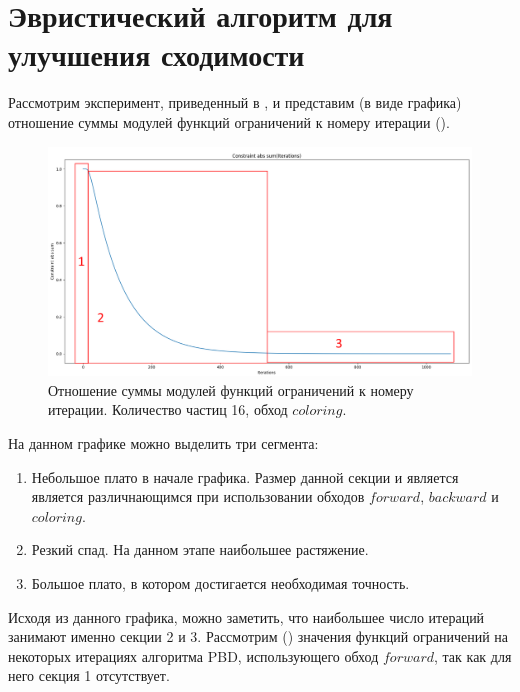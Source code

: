 \section{Эвристический алгоритм для улучшения сходимости} \label{ch3:heuristic}
	Рассмотрим эксперимент, приведенный в , и представим (в виде графика) отношение суммы модулей функций ограничений к номеру итерации (). 

\begin{figure}[ht!] 
	\center
	\includegraphics [scale=0.4] {my_folder/images//plot_16_coloring.png}
	\caption{Отношение суммы модулей функций ограничений к номеру итерации. Количество частиц 16, обход $coloring$.}
	\label{fig:csum-over-iterations}  
\end{figure}	

	На данном графике можно выделить три сегмента:
	\begin{enumerate}[1.]
		\item Небольшое плато в начале графика. Размер данной секции и является является различнающимся при использовании обходов $forward$, $backward$ и $coloring$.
		\item Резкий спад. На данном этапе   наибольшее растяжение.
		\item Большое плато, в котором достигается необходимая точность.
	\end{enumerate}

	Исходя из данного графика, можно заметить, что наибольшее число итераций занимают именно секции 2 и 3. Рассмотрим () значения функций ограничений на некоторых итерациях алгоритма PBD, использующего обход $forward$, так как для него секция 1 отсутствует.
	
